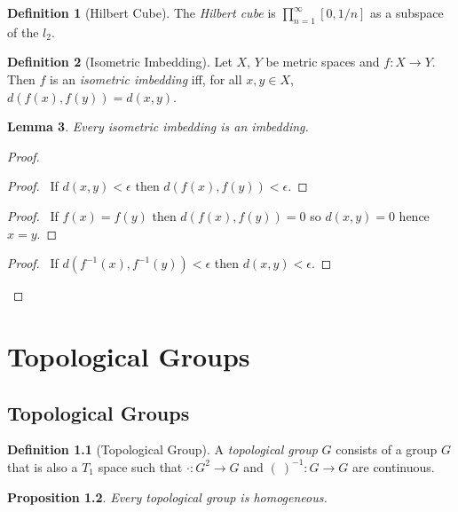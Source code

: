\documentclass{report}
\let\qed\relax
\newtheorem{lm}{Lemma}[section]
\newtheorem{prop}[lm]{Proposition}
\theoremstyle{definition}
\newtheorem{df}[lm]{Definition}
\begin{document}
  \begin{df}[Hilbert Cube]
    The \emph{Hilbert cube} is $\prod_{n=1}^\infty [0, 1/n]$ as a subspace of
    the $l_2$.
  \end{df}

  \begin{df}[Isometric Imbedding]
    Let $X$, $Y$ be metric spaces and $f : X \rightarrow Y$. Then $f$ is an
    \emph{isometric imbedding} iff, for all $x, y \in X$, $d(f(x), f(y)) = d(x,
    y)$.
  \end{df}

  \begin{lm}
    Every isometric imbedding is an imbedding.
  \end{lm}

  \begin{proof}
    \pf
    \begin{proof}
      \pf\ If $d(x, y) < \epsilon$ then $d(f(x), f(y)) < \epsilon$.
    \end{proof}
    \begin{proof}
      \pf\ If $f(x) = f(y)$ then $d(f(x), f(y)) = 0$ so $d(x, y) = 0$ hence $x
      =y $.
    \end{proof}
    \begin{proof}
      \pf\ If $d(f^{-1}(x), f^{-1}(y)) < \epsilon$ then $d(x, y) < \epsilon$.
    \end{proof}
    \qed
  \end{proof}

  \chapter{Topological Groups}

  \section{Topological Groups}

  \begin{df}[Topological Group]
    A \emph{topological group} $G$ consists of a group $G$ that is also a $T_1$
    space such that $\cdot : G^2 \rightarrow G$ and $(\ )^{-1} : G \rightarrow
    G$ are continuous.
  \end{df}

  \begin{prop}
    Every topological group is homogeneous.
  \end{prop}
\end{document}
